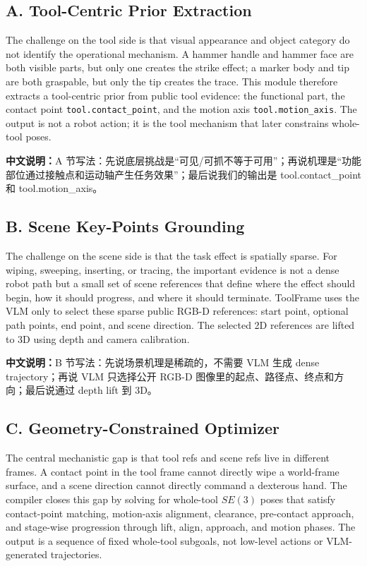 \documentclass[journal]{IEEEtran}
\newcommand{\method}{ToolFrame}
\newcommand{\cn}[1]{\par\smallskip\noindent\textbf{中文说明：}#1\par\smallskip}
\begin{document}
\subsection{A. Tool-Centric Prior Extraction}
The challenge on the tool side is that visual appearance and object category do
not identify the operational mechanism. A hammer handle and hammer face are
both visible parts, but only one creates the strike effect; a marker body and
tip are both graspable, but only the tip creates the trace. This module
therefore extracts a tool-centric prior from public tool evidence: the
functional part, the contact point \texttt{tool.contact\_point}, and the
motion axis \texttt{tool.motion\_axis}. The output is not a robot action; it
is the tool mechanism that later constrains whole-tool poses.

\cn{A 节写法：先说底层挑战是“可见/可抓不等于可用”；再说机理是“功能部位通过接触点和运动轴产生任务效果”；最后说我们的输出是 tool.contact\_point 和 tool.motion\_axis。}

\subsection{B. Scene Key-Points Grounding}
The challenge on the scene side is that the task effect is spatially sparse.
For wiping, sweeping, inserting, or tracing, the important evidence is not a
dense robot path but a small set of scene references that define where the
effect should begin, how it should progress, and where it should terminate.
\method{} uses the VLM only to select these sparse public RGB-D references:
start point, optional path points, end point, and scene direction. The selected
2D references are lifted to 3D using depth and camera calibration.

\cn{B 节写法：先说场景机理是稀疏的，不需要 VLM 生成 dense trajectory；再说 VLM 只选择公开 RGB-D 图像里的起点、路径点、终点和方向；最后说通过 depth lift 到 3D。}

\subsection{C. Geometry-Constrained Optimizer}
The central mechanistic gap is that tool refs and scene refs live in different
frames. A contact point in the tool frame cannot directly wipe a world-frame
surface, and a scene direction cannot directly command a dexterous hand. The
compiler closes this gap by solving for whole-tool $SE(3)$ poses that satisfy
contact-point matching, motion-axis alignment, clearance, pre-contact approach,
and stage-wise progression through lift, align, approach, and motion phases.
The output is a sequence of fixed whole-tool subgoals, not low-level actions or
VLM-generated trajectories.
\end{document}
